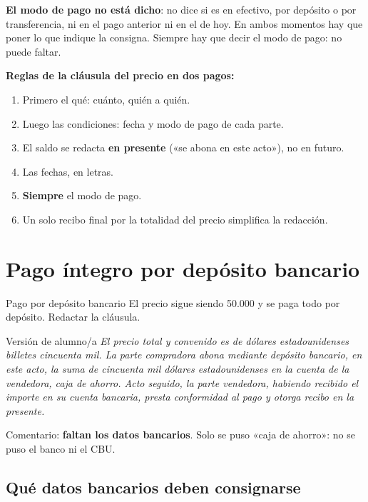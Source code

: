 \documentclass[12pt,oneside]{book}
\begin{document}
\textbf{El modo de pago no está dicho}: no dice si es en efectivo, por depósito o por transferencia, ni en el pago anterior ni en el de hoy. En ambos momentos hay que poner lo que indique la consigna. Siempre hay que decir el modo de pago: no puede faltar.

\begin{important}
\textbf{Reglas de la cláusula del precio en dos pagos:}
\begin{enumerate}
    \item Primero el qué: cuánto, quién a quién.
    \item Luego las condiciones: fecha y modo de pago de cada parte.
    \item El saldo se redacta \textbf{en presente} («se abona en este acto»), no en futuro.
    \item Las fechas, en letras.
    \item \textbf{Siempre} el modo de pago.
    \item Un solo recibo final por la totalidad del precio simplifica la redacción.
\end{enumerate}
\end{important}

\section{Pago íntegro por depósito bancario}

\begin{exercise}{Pago por depósito bancario}
El precio sigue siendo 50.000 y se paga todo por depósito. Redactar la cláusula.
\end{exercise}

\begin{example}{Versión de alumno/a}
\textit{El precio total y convenido es de dólares estadounidenses billetes cincuenta mil. La parte compradora abona mediante depósito bancario, en este acto, la suma de cincuenta mil dólares estadounidenses en la cuenta de la vendedora, caja de ahorro. Acto seguido, la parte vendedora, habiendo recibido el importe en su cuenta bancaria, presta conformidad al pago y otorga recibo en la presente.}
\end{example}

Comentario: \textbf{faltan los datos bancarios}. Solo se puso «caja de ahorro»: no se puso el banco ni el CBU.

\subsection{Qué datos bancarios deben consignarse}
\end{document}
